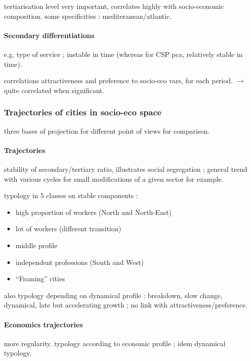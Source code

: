 tertiarisation level very important, correlates highly with socio-economic composition. some specificities : mediteranean/atlantic.

\paragraph{Secondary differentiations}

e.g. type of service ; instable in time (whereas for CSP pca, relatively stable in time).

correlations attractiveness and preference to socio-eco vars, for each period.
$\rightarrow$ quite correlated when significant.

\subsubsection{Trajectories of cities in socio-eco space}

three bases of projection for different point of views for comparison.

\paragraph{Trajectories}

stability of secondary/tertiary ratio, illustrates social segregation ; general trend with various cycles for small modifications of a given sector for example.

typology in 5 classes on stable components :
\begin{itemize}
\item high proportion of workers (North and North-East)
\item lot of workers (different transition)
\item middle profile
\item independent professions (South and West)
\item ``Framing'' cities
\end{itemize}

also typology depending on dynamical profile : breakdown, slow change, dynamical, late but accelerating growth ; no link with attractiveness/preference.

\paragraph{Economics trajectories}

more regularity. typology according to economic profile ; idem dynamical typology.

